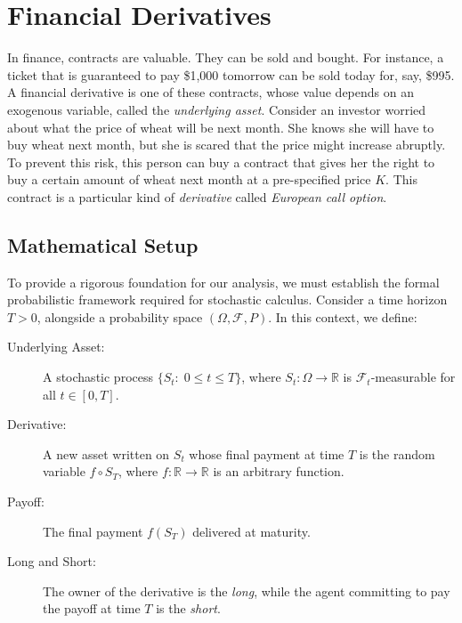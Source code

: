\documentclass{article}
\def\R{\mathbb{R}}
\renewcommand{\to}{\longrightarrow}
\theoremstyle{definition}
\theoremstyle{remark}
\begin{document}
\newpage\tableofcontents\newpage


\section{Financial Derivatives}
In finance, contracts are valuable. They can be sold and bought. For instance, a ticket that is guaranteed to pay \$1,000 tomorrow can be sold today for, say, \$995. A financial derivative is one of these contracts, whose value depends on an exogenous variable, called the \textit{underlying asset}. Consider an investor worried about what the price of wheat will be next month. She knows she will have to buy wheat next month, but she is scared that the price might increase abruptly. To prevent this risk, this person can buy a contract that gives her the right to buy a certain amount of wheat next month at a pre-specified price $K$. This contract is a particular kind of \textit{derivative} called \textit{European call option}.

\subsection*{Mathematical Setup}

To provide a rigorous foundation for our analysis, we must establish the formal probabilistic framework required for stochastic calculus. Consider a time horizon $T > 0$, alongside a probability space $(\Omega, \mathcal{F}, P)$. In this context, we define:

\begin{description}
    \item[Underlying Asset:] A stochastic process $\{S_t:\; 0 \leq t \leq T\}$, where $S_t : \Omega \to \R$ is $\mathcal{F}_t$-measurable for all $t \in [0,T]$.
    \item[Derivative:] A new asset written on $S_t$ whose final payment at time $T$ is the random variable $f \circ S_T$, where $f: \R \to \R$ is an arbitrary function. 
    \item[Payoff:] The final payment $f(S_T)$ delivered at maturity.
    \item[Long and Short:] The owner of the derivative is the \textit{long}, while the agent committing to pay the payoff at time $T$ is the \textit{short}.
\end{description}
\end{document}
